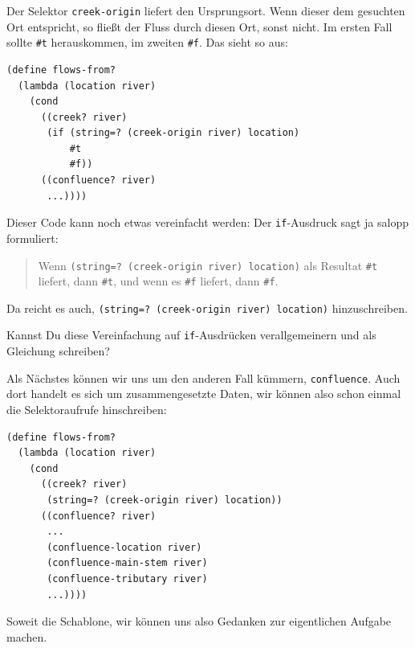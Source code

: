 %
Der Selektor \lstinline{creek-origin} liefert den Ursprungsort.  Wenn dieser dem
gesuchten Ort entspricht, so fließt der Fluss durch diesen Ort, sonst
nicht.  Im ersten Fall sollte \lstinline{#t} herauskommen, im zweiten
\lstinline{#f}.  Das sieht so aus:
%
\begin{lstlisting}
(define flows-from?
  (lambda (location river)
    (cond
      ((creek? river)
       (if (string=? (creek-origin river) location)
           #t
           #f))
      ((confluence? river)
       ...))))
\end{lstlisting}
%
Dieser Code kann noch etwas vereinfacht werden: Der
\lstinline{if}-Ausdruck sagt ja salopp formuliert:
%
\begin{quote}
  Wenn \lstinline{(string=? (creek-origin river) location)} als
  Resultat \lstinline{#t} liefert, dann \lstinline{#t}, und wenn es
  \lstinline{#f} liefert, dann \lstinline{#f}.
\end{quote}
%
Da reicht es auch, \lstinline{(string=? (creek-origin river) location)} hinzuschreiben.
%
\begin{aufgabeinline}\label{aufgabe:iftruefalse}
  Kannst Du diese Vereinfachung auf \lstinline{if}-Ausdrücken
  verallgemeinern und als Gleichung schreiben?
\end{aufgabeinline}
%
Als Nächstes können wir uns um den anderen Fall kümmern,
\lstinline{confluence}.  Auch dort handelt es sich um
zusammengesetzte Daten, wir können also schon einmal die
Selektoraufrufe hinschreiben:
%
\begin{lstlisting}
(define flows-from?
  (lambda (location river)
    (cond
      ((creek? river)
       (string=? (creek-origin river) location))
      ((confluence? river)
       ...
       (confluence-location river)
       (confluence-main-stem river)
       (confluence-tributary river)
       ...))))
\end{lstlisting}
%
Soweit die Schablone, wir können uns also Gedanken zur eigentlichen
Aufgabe machen.

